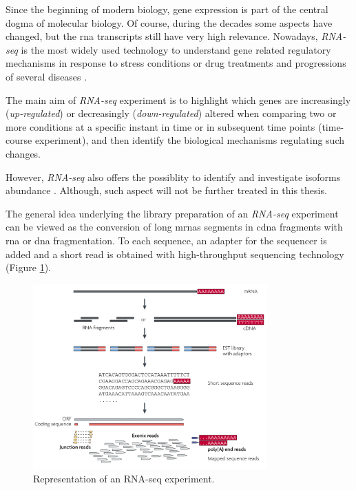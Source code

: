 Since the beginning of modern biology, gene expression is part of the central dogma of molecular biology.
Of course, during the decades some aspects have changed, but the \gls{rna} transcripts still have very high relevance.
Nowadays, \textit{RNA-seq} \cite{Thermes2014, Wang2009, Costa2010, Ozsolak2011} is the most widely used technology to understand gene related regulatory mechanisms in response to stress conditions or drug treatments and progressions of several diseases \cite{Costa2013}.

The main aim of \textit{RNA-seq} experiment is to highlight which genes are increasingly (\textit{up-regulated}) or decreasingly (\textit{down-regulated}) altered when comparing two or more conditions at a specific instant in time or in subsequent time points (time-course experiment), and then identify the biological mechanisms regulating such changes.

However, \textit{RNA-seq} also offers the possiblity to identify and investigate isoforms abundance \cite{Trapnell2010, Roberts2011, Roberts2011a, Trapnell2013}.
Although, such aspect will not be further treated in this thesis.

The general idea underlying the library preparation of an \textit{RNA-seq} experiment can be viewed as the conversion of long \glspl{mrna} segments in \gls{cdna} fragments with \gls{rna} or \gls{dna} fragmentation. 
To each sequence, an adapter for the sequencer is added and a short read is obtained with high-throughput sequencing technology (Figure \ref{fig:rnaseqexp}).

\begin{figure}[h]
\centering
\includegraphics[width=9cm, keepaspectratio]{img/intro/rna-seq.png}
\caption[RNA-seq experiment]{Representation of an RNA-seq experiment. \cite{Wang2009}}
\label{fig:rnaseqexp}

\end{figure}

